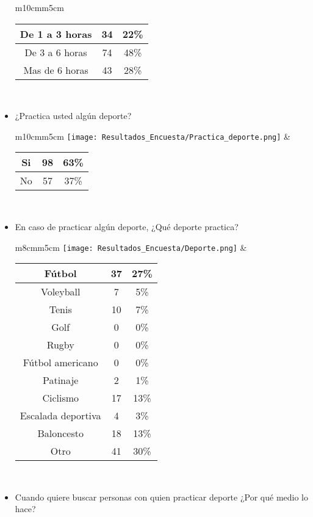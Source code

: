 \begin{itemize}
\begin{tabular}{m{10cm}m{5cm}}
\begin{tabular}{|c|cc|}
         De 1 a 3 horas & 34 & 22\% \\ \hline
         De 3 a 6 horas & 74 & 48\% \\ \hline
         Mas de 6 horas & 43 & 28\% \\ \hline
        \end{tabular} \\
      \end{tabular}
  \item ¿Practica usted algún deporte? \\
  \begin{tabular}{m{10cm}m{5cm}}
        \texttt{[image: Resultados\_Encuesta/Practica\_deporte.png]} &
        \begin{tabular}{|c|cc|}
        \hline
         Si & 98 & 63\% \\ \hline
         No & 57 & 37\% \\ \hline
        \end{tabular} \\
      \end{tabular}
  \item En caso de practicar algún deporte, ¿Qué deporte practica? \\
      \begin{tabular}{m{8cm}m{5cm}}
        \texttt{[image: Resultados\_Encuesta/Deporte.png]} &
        \begin{tabular}{|c|cc|}
        \hline
         Fútbol & 37 & 27\% \\ \hline
         Voleyball & 7 & 5\% \\ \hline
         Tenis & 10 & 7\% \\ \hline
         Golf & 0 & 0\% \\ \hline
         Rugby & 0 & 0\% \\ \hline
         Fútbol americano & 0 & 0\% \\ \hline
         Patinaje & 2 & 1\% \\ \hline
         Ciclismo & 17 & 13\% \\ \hline
         Escalada deportiva & 4 & 3\% \\ \hline
         Baloncesto & 18 & 13\% \\ \hline
         Otro & 41 & 30\% \\ \hline
        \end{tabular} \\
      \end{tabular}
  \item Cuando quiere buscar personas con quien practicar deporte ¿Por qué medio lo hace? \\

\end{itemize}
